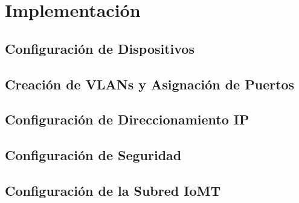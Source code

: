 
\chapter{Implementación}\label{Implementación}

\section{Configuración de Dispositivos}

\section{Creación de VLANs y Asignación de Puertos}

\section{Configuración de Direccionamiento IP}

\section{Configuración de Seguridad}

\section{Configuración de la Subred IoMT}

